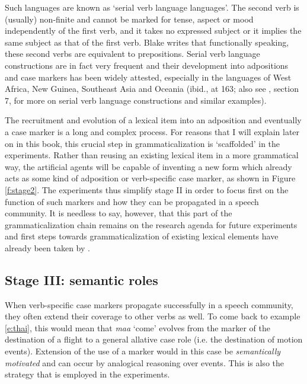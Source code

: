 Such languages are known as `serial verb language languages'. The second verb is (usually) non-finite and cannot be marked for tense, aspect or mood independently of the first verb, and it takes no expressed subject or it implies the same subject as that of the first verb. Blake writes that functionally speaking, these second verbs are equivalent to prepositions. Serial verb language constructions are in fact very frequent and their development into adpositions and case markers has been widely attested, especially in the languages of West Africa, New Guinea, Southeast Asia and Oceania (ibid., at 163; also see \citealp{givon97introduction}, section 7, for more on serial verb language constructions and similar examples).

The recruitment and evolution of a lexical item into an adposition and eventually a case marker is a long and complex process. For reasons that I will explain later on in this book, this crucial step in grammaticalization is `scaffolded' in the experiments. Rather than reusing an existing lexical item in a more grammatical way, the artificial agents will be capable of inventing a new form which already acts as some kind of adposition or verb-specific case marker, as shown in Figure \ref{f:stage2}. The experiments thus simplify stage II in order to focus first on the function of such markers and how they can be propagated in a speech community. It is needless to say, however, that this part of the grammaticalization chain remains on the research agenda for future experiments and first steps towards grammaticalization of existing lexical elements have already been taken by \citet{wellens08flexible}.

\subsection{Stage III: semantic roles}
\label{s:stage3}

When verb-specific case markers propagate successfully in a speech community, they often extend their coverage to other verbs as well. To come back to example \ref{e:thai}, this would mean that {\em maa} `come' evolves from the marker of the destination of a flight to a general allative case role (i.e. the destination of motion events). Extension of the use of a marker would in this case be {\em semantically motivated} and can occur by analogical reasoning over events. This is also the strategy that is employed in the experiments. 

